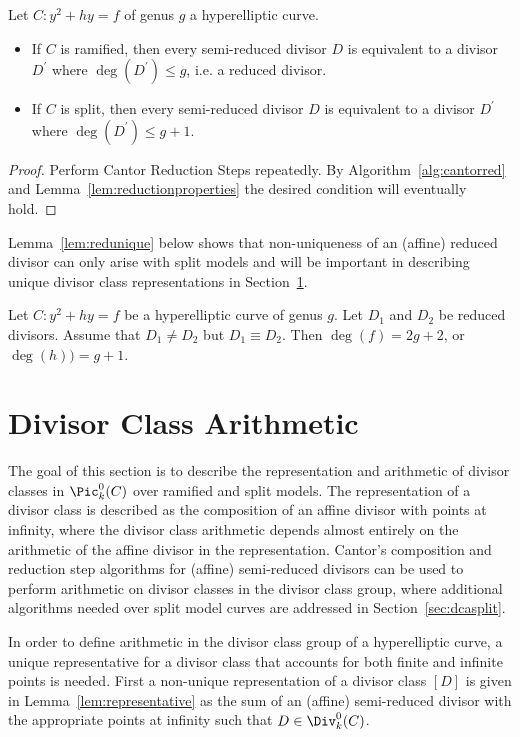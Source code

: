 \bt\label{thm:ramreduced}
\cite[Adapted from Theorem~10.3.21]{Galbraith_PKC_2012} Let $C : y^2 + hy =
f$ of genus $g$ a hyperelliptic curve.  \begin{itemize}
  \item If $C$ is ramified, then every semi-reduced divisor $D$ is equivalent to a divisor
  $D^{\prime}$ where $\deg(D^{\prime}) \leq g$, i.e. a reduced divisor. 
  \item If $C$ is split, then every semi-reduced divisor $D$ is equivalent to a divisor
  $D^{\prime}$ where $\deg(D^{\prime}) \leq g+1$.
\end{itemize}


\begin{proof}
  Perform Cantor Reduction Steps repeatedly. By Algorithm~\ref{alg:cantorred} and
  Lemma~\ref{lem:reductionproperties} the desired condition will eventually
  hold.
\end{proof}
\et

Lemma~\ref{lem:redunique} below shows that non-uniqueness of an (affine) reduced
divisor can only arise with split models and will be important in
describing unique divisor class representations in Section~\ref{sec:dca}.

\bl \label{lem:redunique}
\cite[Adapted from Lemma~10.3.24]{Galbraith_PKC_2012} Let $C : y^2 + hy =
f$ be a hyperelliptic curve of genus $g$. Let $D_1$ and $D_2$ be reduced
divisors. Assume that $D_1 \neq D_2$ but $D_1 \equiv D_2$. Then $\deg(f) = 2g
+ 2$, or $\deg(h)) = g+1$.
\el


\section{Divisor Class Arithmetic}\label{sec:dca}
The goal of this section is to describe the representation and arithmetic of
divisor classes in $\Pic^0_k(C)$ over ramified and split models. The
representation of a divisor class is described as the composition of an
affine divisor with points at infinity, where the divisor class arithmetic
depends almost entirely on the arithmetic of the affine divisor in the
representation. Cantor's composition and reduction step algorithms for (affine)
semi-reduced divisors can be used to perform arithmetic on divisor classes in
the divisor class group, where additional algorithms needed over split model
curves are addressed in Section~\ref{sec:dcasplit}. 

In order to define arithmetic in the divisor class group of a hyperelliptic
curve, a unique representative for a divisor class that accounts for both finite
and infinite points is needed. First a non-unique representation of a divisor
class $[D]$ is given in Lemma~\ref{lem:representative} as the sum of an (affine)
semi-reduced divisor with the appropriate points at infinity such that $D \in
\Div^0_k(C)$.

